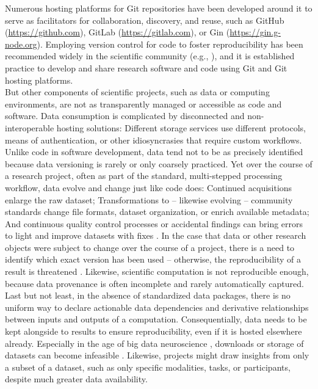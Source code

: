 Numerous hosting platforms for Git repositories have been developed around it to serve as facilitators for collaboration, discovery, and reuse, such as GitHub (\url{https://github.com}), GitLab ({\url{https://gitlab.com}), or Gin (\url{https://gin.g-node.org}).
Employing version control for code to foster reproducibility has been recommended widely in the scientific community (e.g., \citep{sandve2013ten}), and it is established practice to develop and share research software and code using Git and Git hosting platforms. \\
But other components of scientific projects, such as data or computing environments, are not as transparently managed or accessible as code and software.
Data consumption is complicated by disconnected  and non-interoperable hosting solutions:
Different storage services use different protocols, means of authentication, or other idiosyncrasies that require custom workflows.
Unlike code in software development, data tend not to be as precisely identified because data versioning is rarely or only coarsely practiced.
Yet over the course of a research project, often as part of the standard, multi-stepped processing workflow, data evolve and change just like code does:
Continued acquisitions enlarge the raw dataset; Transformations to -- likewise evolving -- community standards change file formats, dataset organization, or enrich available metadata; And continuous quality control processes or accidental findings can bring errors to light and improve datasets with fixes \citep{markiewicz2021openneuro}.
In the case that data or other research objects were subject to change over the course of a project, there is a need to identify which exact version has been used -- otherwise, the reproducibility of a result is threatened \citep{hardwicke2018data}.
Likewise, scientific computation is not reproducible enough, because data provenance is often incomplete and rarely automatically captured.
Last but not least, in the absence of standardized data packages, there is no uniform way to declare actionable
data dependencies and derivative relationships between inputs and outputs of a computation.
Consequentially, data needs to be kept alongside to results to ensure reproducibility, even if it is hosted elsewhere already.
Especially in the age of big data neuroscience \citep{bzdok2017inference}, downloads or storage of datasets can become infeasible \citep{horien2021hitchhiker} \citep{grisham2016proposed}.
Likewise, projects might draw insights from only a subset of a dataset, such as only specific modalities, tasks, or participants, despite much greater data availability.
}
